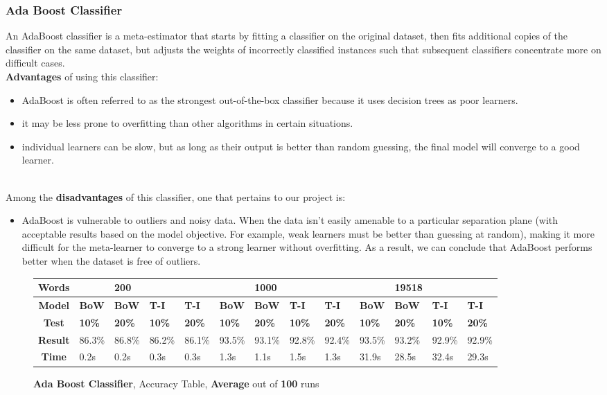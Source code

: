 \documentclass{article}
\begin{document}
	\subsubsection{Ada Boost Classifier}
	An AdaBoost classifier is a meta-estimator that starts by fitting a classifier on the original dataset, then 
fits additional copies of the classifier on the same dataset, but adjusts the weights of incorrectly classified 
instances such that subsequent classifiers concentrate more on difficult cases. \\
\textbf{Advantages} of using this classifier:
\begin{itemize}
\item AdaBoost is often referred to as the strongest out-of-the-box classifier because it uses decision trees as poor learners.
\item it may be less prone to overfitting than other algorithms in certain situations.
\item individual learners can be slow, but as long as their output is better than random guessing, the final model will converge to a good learner.
\end{itemize}
\\
Among the \textbf{disadvantages} of this classifier, one that pertains to our project is:
\begin{itemize}
\item AdaBoost is vulnerable to outliers and noisy data.
When the data isn't easily amenable to a particular separation plane (with acceptable results based on the model objective. 
For example, weak learners must be better than guessing at random), making it more difficult for the meta-learner to converge to a strong learner without overfitting.
As a result, we can conclude that AdaBoost performs better when the dataset is free of outliers.
\end{itemize}
	\begin{figure}[H]
		\begin{tabular}{||c||l|l|l|l||l|l|l|l||l|l|l|l||}
			\hline
			\textbf{Words} &  & \textbf{200} & & & &\textbf{1000} & & & & \textbf{19518} &  & \\ \hline 
			\textbf{Model} & \textbf{BoW} & \textbf{BoW} & \textbf{T-I} & \textbf{T-I} &\textbf{BoW} & \textbf{BoW} & \textbf{T-I} & \textbf{T-I} & \textbf{BoW} & \textbf{BoW} & \textbf{T-I} & \textbf{T-I}\\ \hline
			\textbf{Test} & \textbf{10\%} & \textbf{20\%} & \textbf{10\%} & \textbf{20\%} & \textbf{10\%} & \textbf{20\%} & \textbf{10\%} & \textbf{20\%} & \textbf{10\%} & \textbf{20\%} & \textbf{10\%} & \textbf{20\%} \\ \hline \hline  
			\textbf{Result} & 86.3\% & 86.8\% & 86.2\% & 86.1\% & 93.5\% & 93.1\% & 92.8\% & 92.4\% & 93.5\% & 93.2\% & 92.9\% & 92.9\% \\ \hline 
			\textbf{Time} &0.2s & 0.2s & 0.3s & 0.3s & 1.3s & 1.1s & 1.5s & 1.3s &31.9s & 28.5s & 32.4s & 29.3s \\ \hline 
		\end{tabular}
		\caption{\textbf{Ada Boost Classifier}, Accuracy Table, \textbf{Average} out of \textbf{100} runs}
	\end{figure}
	
\end{document}
